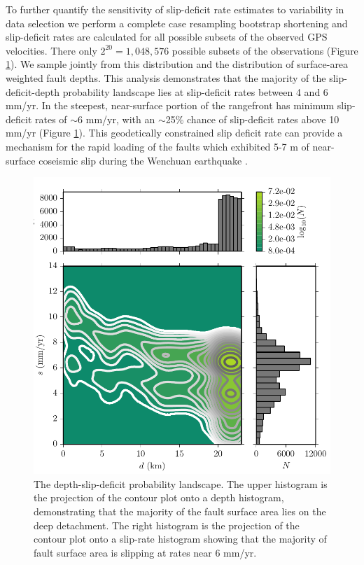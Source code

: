\documentclass[12pt]{article}
\begin{document}
To further quantify the sensitivity of slip-deficit rate estimates to variability in data selection we perform a complete case resampling bootstrap shortening and slip-deficit rates are calculated for all possible subsets of the observed GPS velocities. There only $2^{20} = 1,048,576$ possible subsets of the observations (Figure \ref{fig:distribution}). We sample jointly from this distribution and the distribution of surface-area weighted fault depths. This analysis demonstrates that the majority of the slip-deficit-depth probability landscape lies at slip-deficit rates between 4 and 6 mm/yr. In the steepest, near-surface portion of the rangefront has minimum slip-deficit rates of ${\sim}$6 mm/yr, with an ${\sim}$25\% chance of slip-deficit rates above 10 mm/yr (Figure \ref{fig:distribution}). This geodetically constrained slip deficit rate can provide a mechanism for the rapid loading of the faults which exhibited 5-7 m of near-surface coseismic slip during the Wenchuan earthquake \citep{Xu2009, Shen2009a}. 

\begin{figure}[h!]
    \centering
    \includegraphics{figs/depth_slip_contour.pdf}
    \caption{The depth-slip-deficit probability landscape. The upper histogram is the projection of the contour plot onto a depth histogram, demonstrating that the majority of the fault surface area lies on the deep detachment. The right histogram is the projection of the contour plot onto a slip-rate histogram showing that the majority of fault surface area is slipping at rates near 6 mm/yr.}
    \label{fig:distribution}
\end{figure}
\end{document}
